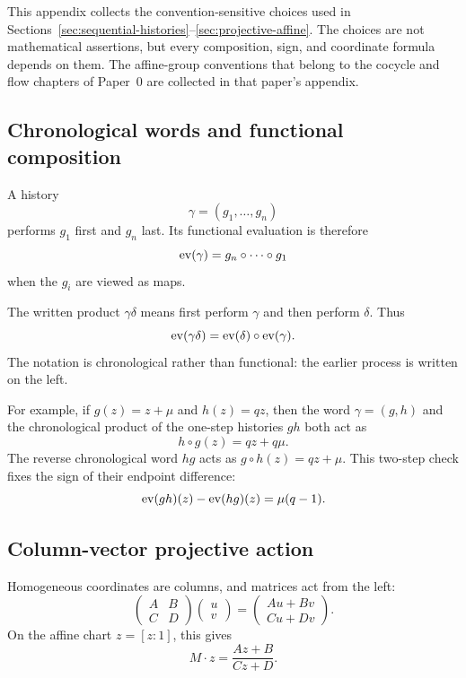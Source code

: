 This appendix collects the convention-sensitive choices used in
Sections~\ref{sec:sequential-histories}--\ref{sec:projective-affine}.  The choices
are not mathematical assertions, but every composition, sign, and coordinate
formula depends on them.  The affine-group conventions that belong to the
cocycle and flow chapters of Paper~0 are collected in that paper's appendix.

\subsection{Chronological words and functional composition}

\begin{convention}
\label{conv:history-order}
A history
\[
  \gamma=(g_1,\ldots,g_n)
\]
performs $g_1$ first and $g_n$ last.  Its functional evaluation is therefore
\[
  \operatorname{ev}(\gamma)=g_n\circ\cdots\circ g_1
\]
when the $g_i$ are viewed as maps.
\end{convention}

\begin{convention}
\label{conv:chronological-concatenation}
The written product $\gamma\delta$ means first perform $\gamma$ and then
perform $\delta$.  Thus
\[
  \operatorname{ev}(\gamma\delta)=\operatorname{ev}(\delta)\circ\operatorname{ev}(\gamma).
\]
The notation is chronological rather than functional: the earlier process is
written on the left.
\end{convention}

For example, if $g(z)=z+\mu$ and $h(z)=qz$, then the word
$\gamma=(g,h)$ and the chronological product of the one-step histories $gh$
both act as
\[
  h\circ g(z)=qz+q\mu.
\]
The reverse chronological word $hg$ acts as $g\circ h(z)=qz+\mu$.  This
two-step check fixes the sign of their endpoint difference:
\[
  \operatorname{ev}(gh)(z)-\operatorname{ev}(hg)(z)=\mu(q-1).
\]

\subsection{Column-vector projective action}

\begin{convention}
\label{conv:column-projective-action}
Homogeneous coordinates are columns, and matrices act from the left:
\[
  \begin{pmatrix}A&B\\C&D\end{pmatrix}
  \begin{pmatrix}u\\v\end{pmatrix}
  =\begin{pmatrix}Au+Bv\\Cu+Dv\end{pmatrix}.
\]
On the affine chart $z=[z:1]$, this gives
\[
  M\cdot z=\frac{Az+B}{Cz+D}.
\]
\end{convention}

